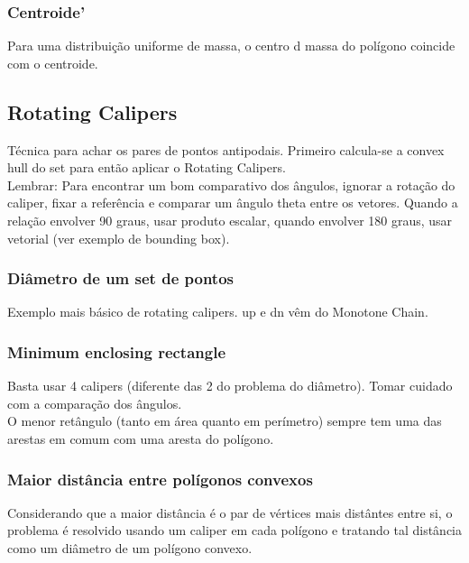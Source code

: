 \subsubsection{Centroide'}
Para uma distribuição uniforme de massa, o centro d massa do pol\'{i}gono coincide com o centroide.
\divisor


\subsection{Rotating Calipers}

T\'{e}cnica para achar os pares de pontos antipodais. Primeiro calcula-se a convex hull do set para ent\~{a}o aplicar o Rotating Calipers.
\\ Lembrar: Para encontrar um bom comparativo dos \^{a}ngulos, ignorar a rota\c{c}\~{a}o do caliper, fixar a refer\^{e}ncia e comparar um \^{a}ngulo theta entre os vetores. Quando a rela\c{c}\~{a}o envolver 90 graus, usar produto escalar, quando envolver 180 graus, usar vetorial (ver exemplo de bounding box).

\subsubsection{Di\^{a}metro de um set de pontos}
Exemplo mais b\'{a}sico de rotating calipers. up e dn v\^{e}m do Monotone Chain.
\divisor

\subsubsection{Minimum enclosing rectangle}
Basta usar 4 calipers (diferente das 2 do problema do di\^{a}metro). Tomar cuidado com a compara\c{c}\~{a}o dos \^{a}ngulos.
\\ O menor ret\^{a}ngulo (tanto em \'{a}rea quanto em per\'{i}metro) sempre tem uma das arestas em comum com uma aresta do pol\'{i}gono.
\divisor

\subsubsection{Maior dist\^{a}ncia entre pol\'{i}gonos convexos}
Considerando que a maior dist\^{a}ncia \'{e} o par de v\'{e}rtices mais dist\^{a}ntes entre si, o problema \'{e}  resolvido usando um caliper em cada pol\'{i}gono e tratando tal dist\^{a}ncia como um di\^{a}metro de um pol\'{i}gono convexo.
\divisor

